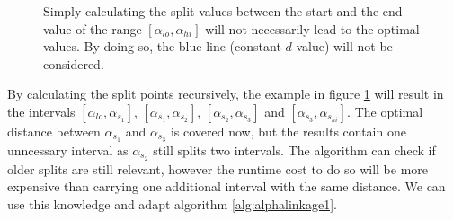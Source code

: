 \begin{figure}[H]
    \centering
    \caption{Simply calculating the split values between the start and the end value of the range $[\alpha_{lo}, \alpha_{hi}]$ will not necessarily lead to the optimal values. By doing so, the blue line (constant $d$ value) will not be considered.}
    \label{fig:notoptimal2}
\end{figure}

By calculating the split points recursively, the example in figure \ref{fig:notoptimal2} will result in the intervals $[\alpha_{lo}, \alpha_{s_1}]$, $[\alpha_{s_1}, \alpha_{s_2}]$, $[\alpha_{s_2}, \alpha_{s_3}]$ and $[\alpha_{s_3}, \alpha_{s_{hi}}]$. The optimal distance between $\alpha_{s_1}$ and $\alpha_{s_3}$ is covered now, but the results contain one unncessary interval as $\alpha_{s_2}$ still splits two intervals. The algorithm can check if older splits are still relevant, however the runtime cost to do so will be more expensive than carrying one additional interval with the same distance. We can use this knowledge and adapt algorithm \ref{alg:alphalinkage1}.

